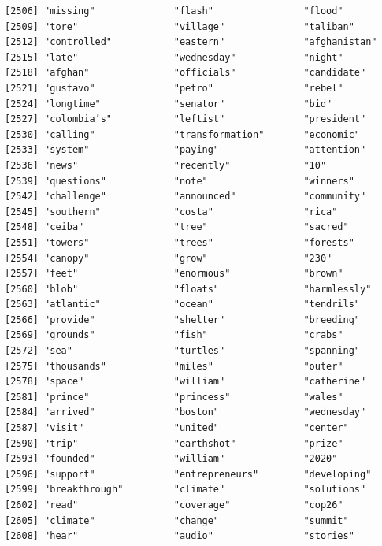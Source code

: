\documentclass[
  letterpaper,
  DIV=11,
  numbers=noendperiod]{scrartcl}
\begin{document}
\begin{verbatim}
[2506] "missing"              "flash"                "flood"               
[2509] "tore"                 "village"              "taliban"             
[2512] "controlled"           "eastern"              "afghanistan"         
[2515] "late"                 "wednesday"            "night"               
[2518] "afghan"               "officials"            "candidate"           
[2521] "gustavo"              "petro"                "rebel"               
[2524] "longtime"             "senator"              "bid"                 
[2527] "colombia’s"           "leftist"              "president"           
[2530] "calling"              "transformation"       "economic"            
[2533] "system"               "paying"               "attention"           
[2536] "news"                 "recently"             "10"                  
[2539] "questions"            "note"                 "winners"             
[2542] "challenge"            "announced"            "community"           
[2545] "southern"             "costa"                "rica"                
[2548] "ceiba"                "tree"                 "sacred"              
[2551] "towers"               "trees"                "forests"             
[2554] "canopy"               "grow"                 "230"                 
[2557] "feet"                 "enormous"             "brown"               
[2560] "blob"                 "floats"               "harmlessly"          
[2563] "atlantic"             "ocean"                "tendrils"            
[2566] "provide"              "shelter"              "breeding"            
[2569] "grounds"              "fish"                 "crabs"               
[2572] "sea"                  "turtles"              "spanning"            
[2575] "thousands"            "miles"                "outer"               
[2578] "space"                "william"              "catherine"           
[2581] "prince"               "princess"             "wales"               
[2584] "arrived"              "boston"               "wednesday"           
[2587] "visit"                "united"               "center"              
[2590] "trip"                 "earthshot"            "prize"               
[2593] "founded"              "william"              "2020"                
[2596] "support"              "entrepreneurs"        "developing"          
[2599] "breakthrough"         "climate"              "solutions"           
[2602] "read"                 "coverage"             "cop26"               
[2605] "climate"              "change"               "summit"              
[2608] "hear"                 "audio"                "stories"             

\end{verbatim}
\end{document}
